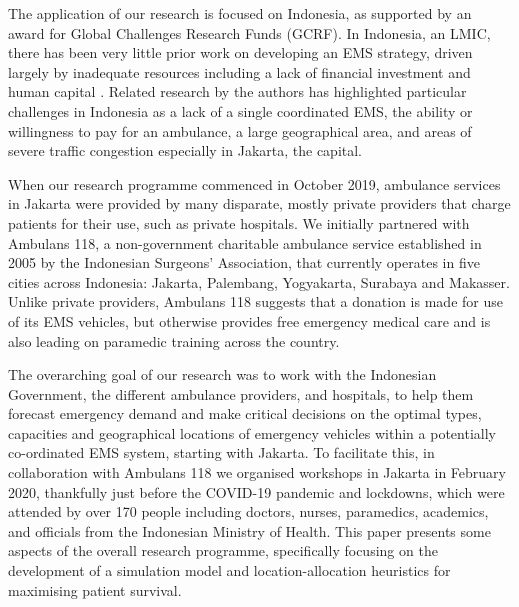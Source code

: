 \documentclass[preprint,12pt]{elsarticle}
\begin{document}
The application of our research is focused on Indonesia, as supported by an
award for Global Challenges Research Funds (GCRF). In Indonesia, an LMIC,
there has been very little prior work on developing an EMS strategy, driven
largely by inadequate resources including a lack of financial investment and
human capital \cite{plummer2017ems,pusponegoro2003terrorism,yusvirazi2018state}.
Related research by the authors \cite{BriceSyaribahNoor2022Esui} has
highlighted particular challenges in Indonesia as a lack of a single
coordinated EMS, the ability or willingness to pay for an ambulance, a large
geographical area, and areas of severe traffic congestion especially in
Jakarta, the capital.  

When our research programme commenced in October 2019, ambulance services in
Jakarta were provided by many disparate, mostly private providers that charge
patients for their use, such as private hospitals. We initially partnered with
Ambulans 118, a non-government charitable ambulance service established in
2005 by the Indonesian Surgeons’ Association, that  currently operates in five
cities across Indonesia: Jakarta, Palembang, Yogyakarta, Surabaya and Makasser.
Unlike private providers, Ambulans 118 suggests that a donation is made for
use of its EMS vehicles, but otherwise provides free emergency medical care
and is also leading on paramedic training across the country. 

The overarching goal of our research was to work with the Indonesian
Government, the different ambulance providers, and hospitals, to help them
forecast emergency demand and make critical decisions on the optimal types,
capacities and geographical locations of emergency vehicles within a
potentially co-ordinated EMS system, starting with Jakarta. To facilitate
this, in collaboration with Ambulans 118 we organised workshops in Jakarta in
February 2020, thankfully just before the COVID-19 pandemic and lockdowns,
which were attended by over 170 people including doctors, nurses, paramedics,
academics, and officials from the Indonesian Ministry of Health. This paper
presents some aspects of the overall research programme, specifically focusing
on the development of a simulation model and location-allocation heuristics
for maximising patient survival.  
\end{document}
